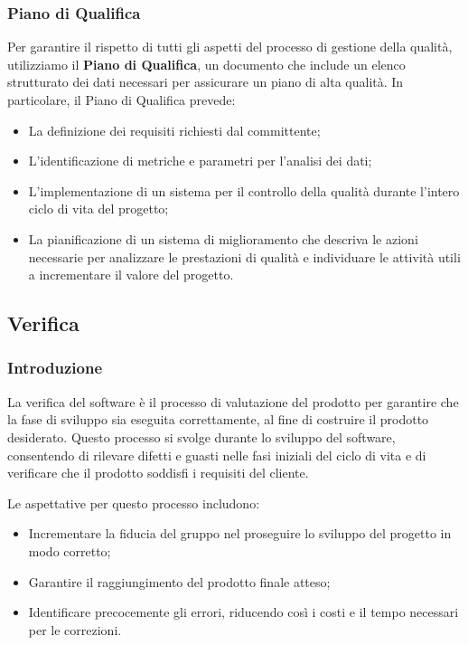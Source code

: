 \subsubsection{Piano di Qualifica}
Per garantire il rispetto di tutti gli aspetti del processo di gestione della qualità, utilizziamo il 
\textbf{Piano di Qualifica}, un documento che include un elenco strutturato dei dati necessari per assicurare un piano di alta qualità. In particolare, il Piano di Qualifica prevede:  
\begin{itemize}
    \item La definizione dei requisiti richiesti dal committente;
    \item L’identificazione di metriche e parametri per l’analisi dei dati;
    \item L’implementazione di un sistema per il controllo della qualità durante l’intero ciclo di vita del progetto;
    \item La pianificazione di un sistema di miglioramento che descriva le azioni necessarie per analizzare le prestazioni di qualità e individuare le attività utili a incrementare il valore del progetto.
\end{itemize}














\subsection{Verifica}
\subsubsection{Introduzione}
La verifica del software è il processo di valutazione del prodotto per garantire che la fase di sviluppo 
sia eseguita correttamente, al fine di costruire il prodotto desiderato. 
Questo processo si svolge durante lo sviluppo del software, consentendo di rilevare difetti e guasti 
nelle fasi iniziali del ciclo di vita e di verificare che il prodotto soddisfi i requisiti del cliente.

Le aspettative per questo processo includono:
\begin{itemize}
    \item Incrementare la fiducia del gruppo nel proseguire lo sviluppo del progetto in modo corretto;
    \item Garantire il raggiungimento del prodotto finale atteso;
    \item Identificare precocemente gli errori, riducendo così i costi e il tempo necessari per le correzioni.
\end{itemize}

